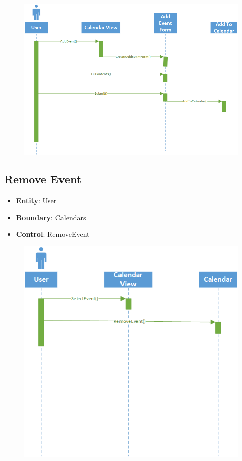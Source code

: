 \clearpage
\begin{figure}[h]
\includegraphics[scale=0.8]{addevent.png}
\end{figure}

\subsection{Remove Event}
\begin{itemize}
\item \textbf{Entity}: User
\item \textbf{Boundary}: Calendars
\item \textbf{Control}: RemoveEvent
\end{itemize}

\begin{figure}[h]
\includegraphics[scale=0.8]{removeevent.png}
\end{figure}
